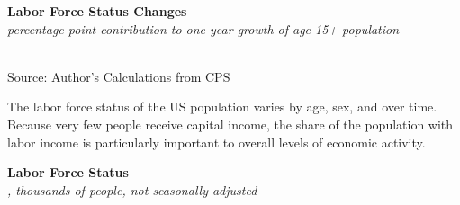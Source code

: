 \documentclass{report}
\makeatletter
\newcommand{\tbllink}[1]{\href{https://raw.githubusercontent.com/bdecon/US-chartbook/master/chartbook/data/#1}{\faTable}}
\newcommand*\short[1]{\expandafter\@gobbletwo\number\numexpr#1\relax}
\newcommand{\tkbar}[4]{
		\addplot[ybar stacked, bar width=2.8pt, draw opacity=0, fill=#1] 
			table [x=#2, y=#3, col sep=comma]{#4};}
\newcommand{\dateaxisticks}{
		date coordinates in=x, axis line style={draw=none},
		xmax={2020-05-10},
		max space between ticks=40,	    
		xtick={{1990-01-01}, {1992-01-01}, {1994-01-01}, 
			{1996-01-01}, {1998-01-01}, {2000-01-01}, 
			{2002-01-01}, {2004-01-01}, {2006-01-01},
			{2008-01-01}, {2010-01-01}, {2012-01-01}, {2014-01-01},
		    {2016-01-01}, {2018-01-01}, {2020-01-01}},
		minor xtick={{1989-01-01}, {1991-01-01}, {1993-01-01},
			{1995-01-01}, {1997-01-01}, {1999-01-01}, 
			{2001-01-01}, {2003-01-01}, {2005-01-01}, {2007-01-01},
		    {2009-01-01}, {2011-01-01}, {2013-01-01}, {2015-01-01},
		    {2017-01-01}, {2019-01-01}},
		enlarge y limits={0.06}, enlarge x limits={0.01},
		}
\newcommand{\bbar}[2]{extra #1 ticks = {{#2}}, extra #1 tick labels = ,
		extra #1 tick style = {grid=major, grid style={thick, black!25}},}
\newcommand{\rbars}{
		\fill[color=black!10] (axis cs:{1990-07-01},\pgfkeysvalueof{/pgfplots/ymin}) rectangle 
			(axis cs:{1991-03-01}, \pgfkeysvalueof{/pgfplots/ymax});
		\fill[color=black!10] (axis cs:{2007-12-01},\pgfkeysvalueof{/pgfplots/ymin}) rectangle 
			(axis cs:{2009-07-01}, \pgfkeysvalueof{/pgfplots/ymax});
		\fill[color=black!10] (axis cs:{2001-03-01},\pgfkeysvalueof{/pgfplots/ymin}) rectangle 
			(axis cs:{2001-11-01}, \pgfkeysvalueof{/pgfplots/ymax});}
\makeatother
\begin{document}
{{{{{{{\begin{minipage}{0.76\textwidth}
\noindent \normalsize \textbf{Labor Force Status Changes}\\
\footnotesize{\textit{percentage point contribution to one-year growth of age 15+ population}}\\
\noindent \hspace*{-2mm} \\
\footnotesize{Source: Author's Calculations from CPS} \hfill \tbllink{cps_lfs2.csv}

\end{minipage}

\newpage

\begin{minipage}{0.76\textwidth}

\small The labor force status of the US population varies by age, sex, and over time. Because very few people receive capital income, the share of the population with labor income is particularly important to overall levels of economic activity. \\

\vspace{1mm}


\noindent \normalsize \textbf{Labor Force Status}\\
\footnotesize{\textit{, thousands of people, not seasonally adjusted}}\\

\vspace{-3mm}

\noindent {} \setlength{\tabcolsep}{3.0pt} \color{black!90}
		{\renewcommand{\arraystretch}{1.52}
		 \begin{tabular}{p{27.8mm} R{11.2mm} R{10.4mm} R{10.4mm} R{10.2mm} R{10.6mm} R{10.4mm} R{10.4mm}}
			 \hline
		\end{tabular}
		}	\\
		

\end{minipage}}}}}}}}
\end{document}
